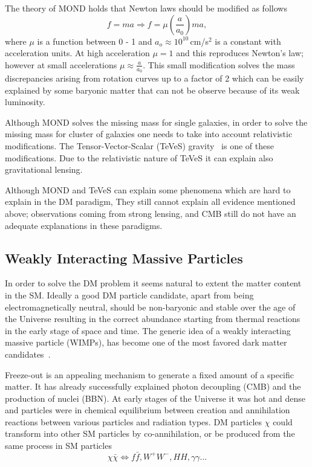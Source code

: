 The theory of MOND holds that Newton laws should be modified as follows
\begin{equation}
	f= ma \Rightarrow f= \mu\left(\frac{a}{a_0}\right)ma,
\end{equation}
where $\mu$ is a function between 0 - 1 and $a_o \approx 10^{10}$\,cm/s$^2$ is a constant with acceleration units. At high acceleration $\mu =1$ and this reproduces Newton’s law; however at small accelerations $\mu \approx \frac{a}{a_0}$. This small modification solves the mass discrepancies arising from rotation curves up to a factor of 2 which can be easily explained by some baryonic matter that can not be observe because of its weak luminosity.

Although MOND solves the missing mass for single galaxies, in order to solve the missing mass for cluster of galaxies one needs to take into account relativistic modifications. The Tensor-Vector-Scalar (TeVeS) gravity~\cite{Bekenstein:2009bd} is one of these modifications. Due to the relativistic nature of TeVeS it can explain also gravitational
lensing.

Although MOND and TeVeS can explain some phenomena which are hard to explain in the DM paradigm, They still cannot explain all evidence mentioned above; observations coming from strong lensing, and CMB still do not have an adequate explanations in these paradigms.


\subsection{Weakly Interacting Massive Particles}
\label{subsec:WIMP}

In order to solve the DM problem it seems natural to extent the matter content in the SM. Ideally a good DM particle candidate, apart from being electromagnetically neutral, should be non-baryonic and stable over the age of the Universe resulting in the correct abundance starting from thermal reactions in the early stage of space and time. The generic idea of a weakly
interacting massive particle (WIMPs), has become one of the most favored dark
matter candidates~\cite{Steigman:1984ac}.

Freeze-out is an appealing mechanism to generate a fixed amount of a specific matter. It has already successfully explained photon decoupling (CMB) and the production of nuclei (BBN). At early stages of the Universe it was hot and dense and particles were in chemical equilibrium between creation and annihilation reactions between various particles and radiation types. DM particles $\chi$ could transform into other SM particles by co-annihilation, or be produced from the same process in SM particles  
\begin{equation}
\chi\bar{\chi} \Leftrightarrow f\bar{f}, W^+W^-, HH, \gamma\gamma ...
\end{equation}

